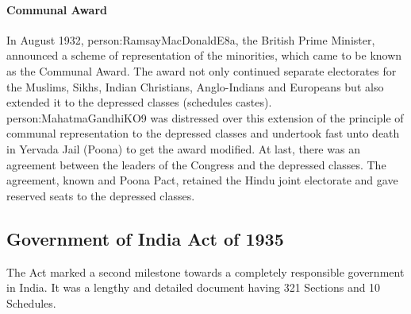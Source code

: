 \paragraph{Communal Award}
In August 1932, \gls{person:RamsayMacDonaldE8a}, the British Prime Minister, announced a scheme of representation of the minorities, which came to be known as the Communal Award. The award not only continued separate electorates for the Muslims, Sikhs, Indian Christians, Anglo-Indians and Europeans but also extended it to the depressed classes (schedules castes). \gls{person:MahatmaGandhiKO9} was distressed over this extension of the principle of communal representation to the depressed classes and undertook fast unto death in Yervada Jail (Poona) to get the award modified. At last, there was an agreement between the leaders of the Congress and the depressed classes. The agreement, known and Poona Pact, retained the Hindu joint electorate and gave reserved seats to the depressed classes.



\subsection{Government of India Act of 1935}

The Act marked a second milestone towards a completely responsible government in India. It was a lengthy and detailed document having 321 Sections and 10 Schedules.

